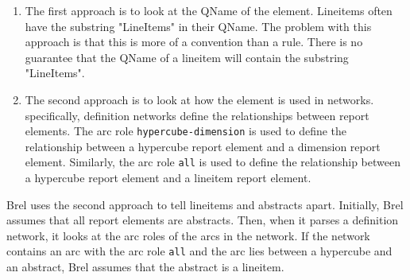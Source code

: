 \begin{enumerate}
    \item The first approach is to look at the QName of the element.
    Lineitems often have the substring "LineItems" in their QName.
    The problem with this approach is that this is more of a convention than a rule.
    There is no guarantee that the QName of a lineitem will contain the substring "LineItems".
    \item The second approach is to look at how the element is used in networks.
    specifically, definition networks define the relationships between report elements.
    The arc role \texttt{hypercube-dimension} is used to define the relationship between a hypercube report element and a dimension report element.
    Similarly, the arc role \texttt{all} is used to define the relationship between a hypercube report element and a lineitem report element.
\end{enumerate}

Brel uses the second approach to tell lineitems and abstracts apart.
Initially, Brel assumes that all report elements are abstracts.
Then, when it parses a definition network, it looks at the arc roles of the arcs in the network.
If the network contains an arc with the arc role \texttt{all} and the arc lies between a hypercube and an abstract, Brel assumes that the abstract is a lineitem.


